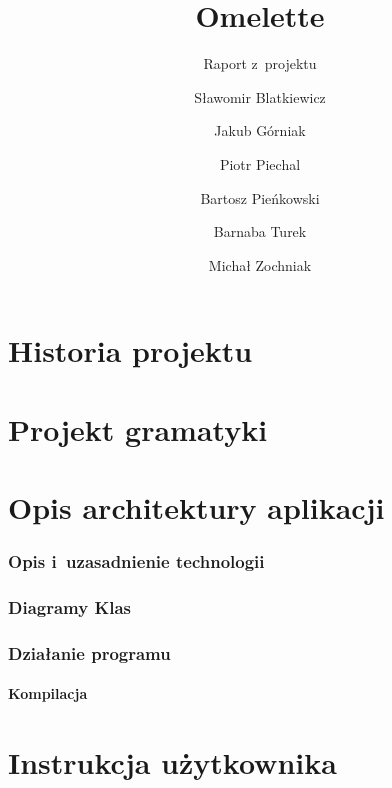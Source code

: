 \documentclass[a4paper]{scrartcl}
\let\stdpart\part
\renewcommand\part{\newpage\stdpart}
\begin{document}
\sloppy

\title{Omelette}
\subtitle{Raport z~projektu}
\author{
  Sławomir Blatkiewicz\and
  Jakub Górniak       \and
  Piotr Piechal       \and
  Bartosz Pieńkowski  \and
  Barnaba Turek       \and
  Michał Zochniak
}

\maketitle
\thispagestyle{empty}

\part{Historia projektu}




\part{Projekt gramatyki}


\part{Opis architektury aplikacji}
\section{Opis i~uzasadnienie technologii}

\section{Diagramy Klas}

\section{Działanie programu}
\subsection{Kompilacja}


\part{Instrukcja użytkownika}


\end{document}
